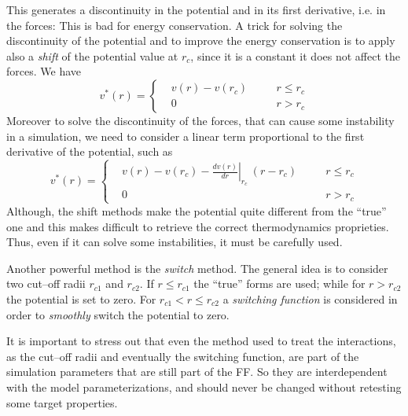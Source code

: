 This generates a discontinuity in the potential and in its first derivative, i.e. in the forces: This is bad for energy conservation. A trick for solving the discontinuity of the potential and to improve the energy conservation is to apply also a \textit{shift} of the potential value at $r_c$, since it is a constant it does not affect the forces. We have
\begin{equation*}
v^*(r) = \left \{
	\begin{aligned}
&v(r) - v(r_c) & \quad & r \le r_c \\
&0    & \quad  & r >   r_c
	\end{aligned} \right .
\end{equation*}
Moreover to solve the discontinuity of the forces, that can cause some instability in a simulation, we need to consider a linear term proportional to the first derivative of the potential, such as
\begin{equation*}
v^*(r) = \left \{
	\begin{aligned}
&v(r) - v(r_c) - \left . \frac{dv(r)}{dr}\right |_{r_c}\ (r - r_c) & \quad & r \le r_c \\
&0    & \quad  & r >   r_c
	\end{aligned} \right .
\end{equation*}
Although, the shift methods make the potential quite different from the ``true'' one and this makes difficult to retrieve the correct thermodynamics proprieties. Thus, even if it can solve some instabilities, it must be carefully used.

Another powerful method is the \textit{switch} method. The general idea is to consider two cut--off radii  $r_{c1}$ and $r_{c2}$. If $r \le r_{c1}$ the ``true'' forms are used; while for $r > r_{c2}$ the potential is set to zero. For $r_{c1} < r \le r_{c2}$ a \textit{switching function} is considered in order to \textit{smoothly} switch the potential to zero.

It is important to stress out that even the method used to treat the interactions, as the cut--off radii and eventually the switching function, are part of the simulation parameters that are still part of the \ac{FF}. So they are interdependent with the model parameterizations, and should never be changed without retesting some target properties.


